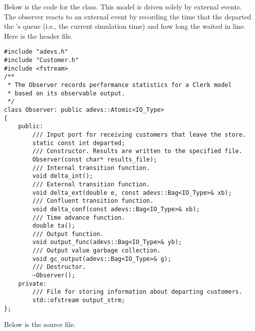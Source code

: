 Below is the code for the  class. This model is driven solely by external events. The observer reacts to an external event by recording the time that the  departed the 's queue (i.e., the current simulation time) and how long the  waited in line. Here is the  header file.
\begin{verbatim}
#include "adevs.h"
#include "Customer.h"
#include <fstream>
/**
 * The Observer records performance statistics for a Clerk model
 * based on its observable output.
 */
class Observer: public adevs::Atomic<IO_Type>
{
    public:
        /// Input port for receiving customers that leave the store.
        static const int departed;
        /// Constructor. Results are written to the specified file.
        Observer(const char* results_file);
        /// Internal transition function.
        void delta_int();
        /// External transition function.
        void delta_ext(double e, const adevs::Bag<IO_Type>& xb);
        /// Confluent transition function.
        void delta_conf(const adevs::Bag<IO_Type>& xb);
        /// Time advance function.
        double ta();
        /// Output function.  
        void output_func(adevs::Bag<IO_Type>& yb);
        /// Output value garbage collection.
        void gc_output(adevs::Bag<IO_Type>& g);
        /// Destructor.
        ~Observer();
    private:    
        /// File for storing information about departing customers.
        std::ofstream output_strm;
}; 
\end{verbatim}
Below is the  source file.

